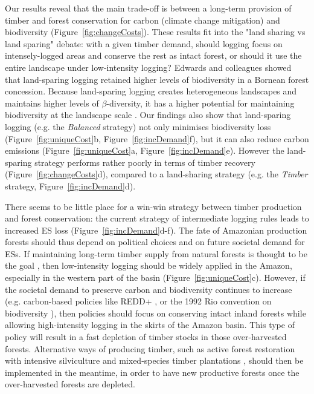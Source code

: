 \documentclass{article}
\begin{document}
Our results reveal that the main trade-off is between a long-term provision of timber and forest conservation for carbon (climate change mitigation) and biodiversity (Figure~\ref{fig:changeCosts}). These results fit into the "land sharing vs land sparing" debate: with a given timber demand, should logging focus on intensely-logged areas and conserve the rest as intact forest, or should it use the entire landscape under low-intensity logging? Edwards and colleagues \cite{Edwards2014} showed that land-sparing logging retained higher levels of biodiversity in a Bornean forest concession. Because land-sparing logging creates heterogeneous landscapes and maintains higher levels of $\beta$-diversity, it has a higher potential for maintaining biodiversity at the landscape scale \cite{DeCastroSolar2015}. Our findings also show that land-sparing logging (e.g. the \textit{Balanced} strategy) not only minimises biodiversity loss (Figure~\ref{fig:uniqueCost}b, Figure~\ref{fig:incDemand}f), but it can also reduce carbon emissions (Figure~\ref{fig:uniqueCost}a, Figure~\ref{fig:incDemand}e). 
However the land-sparing strategy performs rather poorly in terms of timber recovery (Figure~\ref{fig:changeCosts}d), compared to a land-sharing strategy (e.g. the \textit{Timber} strategy, Figure~\ref{fig:incDemand}d). 

There seems to be little place for a win-win strategy between timber production and forest conservation: the current strategy of intermediate logging rules leads to increased ES loss (Figure~\ref{fig:incDemand}d-f). The fate of Amazonian production forests should thus depend on political choices and on future societal demand for ESs. If maintaining long-term timber supply from natural forests is thought to be the goal \cite{Zarin2007}, then low-intensity logging should be widely applied in the Amazon, especially in the western part of the basin (Figure~\ref{fig:uniqueCost}c).
However, if the societal demand to preserve carbon and biodiversity continues to increase (e.g. carbon-based policies like REDD+ \cite{Stickler2009}, or the 1992 Rio convention on biodiversity \cite{Barton1992}), then policies should focus on conserving intact inland forests while allowing high-intensity logging in the skirts of the Amazon basin. This type of policy will result in a fast depletion of timber stocks in those over-harvested forests. Alternative ways of producing timber, such as active forest restoration with intensive silviculture and mixed-species timber plantations \cite{Lamb2005}, should then be implemented in the meantime, in order to have new productive forests once the over-harvested forests are depleted. 
\end{document}
